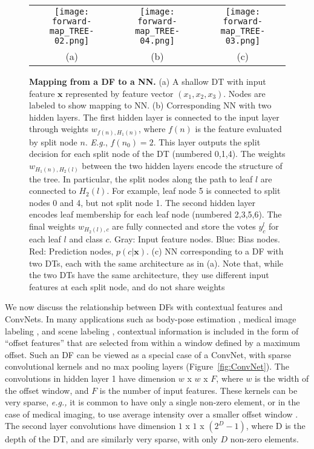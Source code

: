 \documentclass[twocolumn]{svjour3}
\begin{document}
\begin{figure*}
\begin{center}
\begin{tabular}{ccc}

   \texttt{[image: forward-map\_TREE-02.png]} &
   \texttt{[image: forward-map\_TREE-04.png]} &
   \texttt{[image: forward-map\_TREE-03.png]} \\
				   (a) & (b) & (c)
\end{tabular}
\end{center}
   \caption{\textbf{Mapping from a DF to a NN.} (a) A shallow DT with input feature $\mathbf{x}$ represented by feature vector $(x_1,x_2,x_3)$. Nodes are labeled to show mapping to NN. (b) Corresponding NN with two hidden layers. The first hidden layer is connected to the input layer through weights $w_{f(n),H_1(n)}$, where $f(n)$ is the feature evaluated by split node $n$. \textit{E.g.}, $f(n_0)=2$.  This layer outputs the split decision for each split node of the DT (numbered 0,1,4). The weights $w_{H_1(n),H_2(l)}$ between the two hidden layers encode the structure of the tree. In particular, the split nodes along the path to leaf $l$ are connected to $H_2(l)$. For example, leaf node 5 is connected to split nodes 0 and 4, but not split node 1. The second hidden layer encodes leaf membership for each leaf node (numbered 2,3,5,6). The final weights $w_{H_2(l),c}$ are fully connected and store the votes $y^l_c$ for each leaf $l$ and class $c$. Gray: Input feature nodes. Blue: Bias nodes. Red: Prediction nodes, $p(c | \mathbf{x})$. (c) NN corresponding to a DF with two DTs, each with the same architecture as in (a). Note that, while the two DTs have the same architecture, they use different input features at each split node, and do not share weights}
\label{fig:forward-map_TREE}
\end{figure*}

We now discuss the relationship between DFs with contextual features and ConvNets.
In many applications such as body-pose estimation \cite{shaoqing15grrf}, medical image labeling \cite{ERFs}, and scene labeling \cite{Tu2010}, contextual information is included in the form of ``offset features'' that are selected from within a window defined by a maximum offset.
Such an DF can be viewed as a special case of a ConvNet, with sparse convolutional kernels and no max pooling layers (Figure~\ref{fig:ConvNet}).
The convolutions in hidden layer 1 have dimension $w$ x $w$ x $F$, where $w$ is the width of the offset window, and $F$ is the number of input features.
These kernels can be very sparse, \emph{e.g.,} it is common to have only a single non-zero element, or in the case of medical imaging, to use average intensity over a smaller offset window \cite{ERFs}.
The second layer convolutions have dimension $1$ x $1$ x $(2^D-1)$, where D is the depth of the DT, and are similarly very sparse, with only $D$ non-zero elements.
\end{document}

